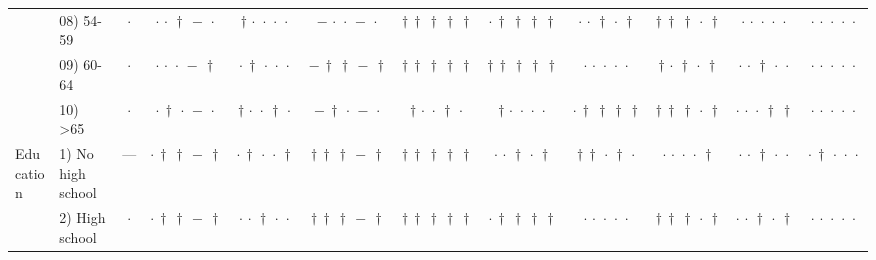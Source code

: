 {\begin{longtable}[t]{llcccccccccc}
 & 08) 54-59 & $\cdot$ & ${\cdot}\,{\cdot}\,{\dagger}\,{-}\,{\cdot}$ & ${\dagger}\,{\cdot}\,{\cdot}\,{\cdot}\,{\cdot}$ & ${-}\,{\cdot}\,{\cdot}\,{-}\,{\cdot}$ & ${\dagger}\,{\dagger}\,{\dagger}\,{\dagger}\,{\dagger}$ & ${\cdot}\,{\dagger}\,{\dagger}\,{\dagger}\,{\dagger}$ & ${\cdot}\,{\cdot}\,{\dagger}\,{\cdot}\,{\dagger}$ & ${\dagger}\,{\dagger}\,{\dagger}\,{\cdot}\,{\dagger}$ & ${\cdot}\,{\cdot}\,{\cdot}\,{\cdot}\,{\cdot}$ & ${\cdot}\,{\cdot}\,{\cdot}\,{\cdot}\,{\cdot}$ \\
 & 09) 60-64 & $\cdot$ & ${\cdot}\,{\cdot}\,{\cdot}\,{-}\,{\dagger}$ & ${\cdot}\,{\dagger}\,{\cdot}\,{\cdot}\,{\cdot}$ & ${-}\,{\dagger}\,{\dagger}\,{-}\,{\dagger}$ & ${\dagger}\,{\dagger}\,{\dagger}\,{\dagger}\,{\dagger}$ & ${\dagger}\,{\dagger}\,{\dagger}\,{\dagger}\,{\dagger}$ & ${\cdot}\,{\cdot}\,{\cdot}\,{\cdot}\,{\cdot}$ & ${\dagger}\,{\cdot}\,{\dagger}\,{\cdot}\,{\dagger}$ & ${\cdot}\,{\cdot}\,{\dagger}\,{\cdot}\,{\cdot}$ & ${\cdot}\,{\cdot}\,{\cdot}\,{\cdot}\,{\cdot}$ \\
 & 10) >65 & $\cdot$ & ${\cdot}\,{\dagger}\,{\cdot}\,{-}\,{\cdot}$ & ${\dagger}\,{\cdot}\,{\cdot}\,{\dagger}\,{\cdot}$ & ${-}\,{\dagger}\,{\cdot}\,{-}\,{\cdot}$ & ${\dagger}\,{\cdot}\,{\cdot}\,{\dagger}\,{\cdot}$ & ${\dagger}\,{\cdot}\,{\cdot}\,{\cdot}\,{\cdot}$ & ${\cdot}\,{\dagger}\,{\dagger}\,{\dagger}\,{\dagger}$ & ${\dagger}\,{\dagger}\,{\dagger}\,{\cdot}\,{\dagger}$ & ${\cdot}\,{\cdot}\,{\cdot}\,{\dagger}\,{\dagger}$ & ${\cdot}\,{\cdot}\,{\cdot}\,{\cdot}\,{\cdot}$ \\
\cline{1-12}
\multirow[t]{5}{*}{Education} & 1) No high school & --- & ${\cdot}\,{\dagger}\,{\dagger}\,{-}\,{\dagger}$ & ${\cdot}\,{\dagger}\,{\cdot}\,{\cdot}\,{\dagger}$ & ${\dagger}\,{\dagger}\,{\dagger}\,{-}\,{\dagger}$ & ${\dagger}\,{\dagger}\,{\dagger}\,{\dagger}\,{\dagger}$ & ${\cdot}\,{\cdot}\,{\dagger}\,{\cdot}\,{\dagger}$ & ${\dagger}\,{\dagger}\,{\cdot}\,{\dagger}\,{\cdot}$ & ${\cdot}\,{\cdot}\,{\cdot}\,{\cdot}\,{\dagger}$ & ${\cdot}\,{\cdot}\,{\dagger}\,{\cdot}\,{\cdot}$ & ${\cdot}\,{\dagger}\,{\cdot}\,{\cdot}\,{\cdot}$ \\
 & 2) High school & $\cdot$ & ${\cdot}\,{\dagger}\,{\dagger}\,{-}\,{\dagger}$ & ${\cdot}\,{\cdot}\,{\dagger}\,{\cdot}\,{\cdot}$ & ${\dagger}\,{\dagger}\,{\dagger}\,{-}\,{\dagger}$ & ${\dagger}\,{\dagger}\,{\dagger}\,{\dagger}\,{\dagger}$ & ${\cdot}\,{\dagger}\,{\dagger}\,{\dagger}\,{\dagger}$ & ${\cdot}\,{\cdot}\,{\cdot}\,{\cdot}\,{\cdot}$ & ${\dagger}\,{\dagger}\,{\dagger}\,{\cdot}\,{\dagger}$ & ${\cdot}\,{\cdot}\,{\dagger}\,{\cdot}\,{\dagger}$ & ${\cdot}\,{\cdot}\,{\cdot}\,{\cdot}\,{\cdot}$ \\

\end{longtable}}

